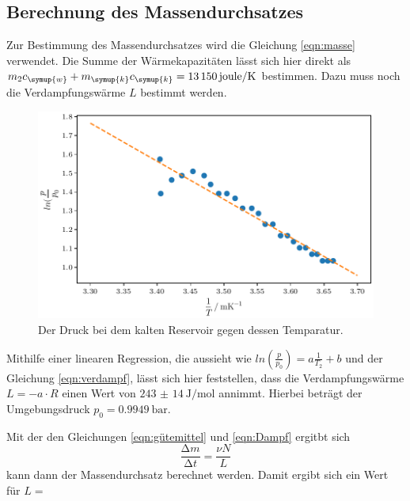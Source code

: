  \subsection{Berechnung des Massendurchsatzes}

Zur Bestimmung des Massendurchsatzes wird die Gleichung \ref{eqn:masse} verwendet. Die Summe der Wärmekapazitäten lässt sich hier 
direkt als $m_2c_{\symup{w}}+m_{\symup{k}}c_{\symup{k}}=\qty{13150}{joule\per\kelvin}$ bestimmen. Dazu muss noch die Verdampfungswärme
$L$ bestimmt werden.

\begin{figure}
    \centering
    \includegraphics{verdampfplot.pdf}
    \caption{Der Druck bei dem kalten Reservoir gegen dessen Temparatur.}
    \label{fig:druckkalt}
\end{figure}

Mithilfe einer linearen Regression, die aussieht wie $ln(\frac{p}{p_0})=a\frac{1}{T_2}+b$ und der Gleichung \ref{eqn:verdampf},
lässt sich hier feststellen, dass die Verdampfungswärme $L=-a \cdot R$ einen Wert von $\qty{243(14)}{\joule\per\mole}$ annimmt.
Hierbei beträgt der Umgebungsdruck $p_0=\qty{0.9949}{\bar}$. \cite{pdortmund}

Mit der den Gleichungen \ref{eqn:gütemittel} und \ref{eqn:Dampf} ergitbt sich 
\begin{equation*}
  \frac{\increment m}{\increment t}=\frac{\nu N}{L}
\end{equation*}
kann dann der Massendurchsatz berechnet werden.
Damit ergibt sich ein Wert für $L=\qty{}{}$


